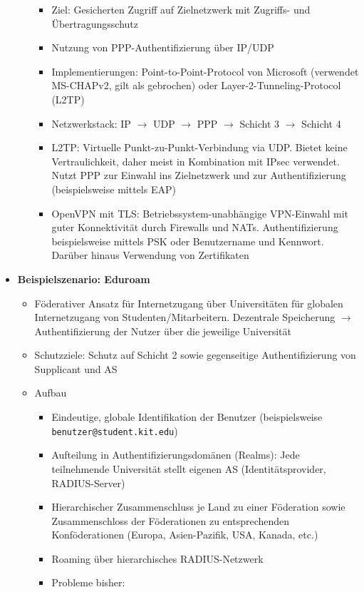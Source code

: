 \begin{itemize}
\begin{itemize}
		\begin{itemize}
			\item Ziel: Gesicherten Zugriff auf Zielnetzwerk mit Zugriffs- und Übertragungsschutz
			\item Nutzung von PPP-Authentifizierung über IP/UDP
			\item Implementierungen: Point-to-Point-Protocol von Microsoft (verwendet MS-CHAPv2, gilt als gebrochen) oder Layer-2-Tunneling-Protocol (L2TP)
			\item Netzwerkstack: IP \(\rightarrow\) UDP \(\rightarrow\) PPP \(\rightarrow\) Schicht 3 \(\rightarrow\) Schicht 4
			\item L2TP: Virtuelle Punkt-zu-Punkt-Verbindung via UDP. Bietet keine Vertraulichkeit, daher meist in Kombination mit IPsec verwendet. Nutzt PPP zur Einwahl ins Zielnetzwerk und zur Authentifizierung (beispielsweise mittels EAP)
			\item OpenVPN mit TLS: Betriebssystem-unabhängige VPN-Einwahl mit guter Konnektivität durch Firewalls und NATs. Authentifizierung beispielsweise mittels PSK oder Benutzername und Kennwort. Darüber hinaus Verwendung von Zertifikaten
		\end{itemize}
	\end{itemize}
	\item \textbf{Beispielszenario: Eduroam}
	\begin{itemize}
		\item Föderativer Ansatz für Internetzugang über Universitäten für globalen Internetzugang von Studenten/Mitarbeitern. Dezentrale Speicherung \(\rightarrow\) Authentifizierung der Nutzer über die jeweilige Universität
		\item Schutzziele: Schutz auf Schicht 2 sowie gegenseitige Authentifizierung von Supplicant und AS
		\item Aufbau
		\begin{itemize}
			\item Eindeutige, globale Identifikation der Benutzer (beispielsweise \texttt{benutzer@student.kit.edu})
			\item Aufteilung in Authentifizierungsdomänen (Realms): Jede teilnehmende Universität stellt eigenen AS (Identitätsprovider, RADIUS-Server)
			\item Hierarchischer Zusammenschluss je Land zu einer Föderation sowie Zusammenschloss der Föderationen zu entsprechenden Konföderationen (Europa, Asien-Pazifik, USA, Kanada, etc.)
			\item Roaming über hierarchisches RADIUS-Netzwerk
			\item Probleme bisher:

\end{itemize}
\end{itemize}
\end{itemize}
